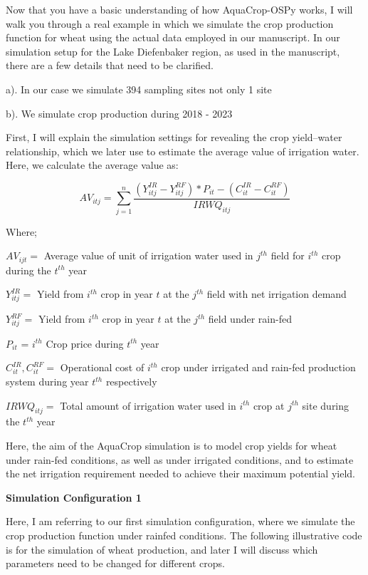 \documentclass[
  letterpaper,
  DIV=11,
  numbers=noendperiod]{scrartcl}
\begin{document}
Now that you have a basic understanding of how AquaCrop-OSPy works, I
will walk you through a real example in which we simulate the crop
production function for wheat using the actual data employed in our
manuscript. In our simulation setup for the Lake Diefenbaker region, as
used in the manuscript, there are a few details that need to be
clarified.

a). In our case we simulate 394 sampling sites not only 1 site

b). We simulate crop production during 2018 - 2023

First, I will explain the simulation settings for revealing the crop
yield--water relationship, which we later use to estimate the average
value of irrigation water. Here, we calculate the average value as:

\begin{equation}

{AV_{itj}} =     \sum_{j=1}^{n} \frac{(Y^{IR}_{itj} -Y^{RF}_{itj})*P_{it}-(C^{IR}_{it}-C^{RF}_{it})}{IRWQ_{itj}}
\label{equation1}
\end{equation}

Where;

\(AV_{ijt}=\) Average value of unit of irrigation water used in
\(j^{th}\) field for \(i^{th}\) crop during the \(t^{th}\) year

\(Y^{IR}_{itj}=\) Yield from \(i^{th}\) crop in year \(t\) at the
\(j^{th}\) field with net irrigation demand

\(Y^{RF}_{itj}=\) Yield from \(i^{th}\) crop in year \(t\) at the
\(j^{th}\) field under rain-fed

\(P_{it}\) = \(i^{th}\) Crop price during \(t^{th}\) year

\(C^{IR}_{it},C^{RF}_{it}=\) Operational cost of \(i^{th}\) crop under
irrigated and rain-fed production system during year \(t^{th}\)
respectively

\(IRWQ_{itj}=\) Total amount of irrigation water used in \(i^{th}\) crop
at \(j^{th}\) site during the \(t^{th}\) year

Here, the aim of the AquaCrop simulation is to model crop yields for
wheat under rain-fed conditions, as well as under irrigated conditions,
and to estimate the net irrigation requirement needed to achieve their
maximum potential yield.

\textbf{Simulation Configuration 1}

Here, I am referring to our first simulation configuration, where we
simulate the crop production function under rainfed conditions. The
following illustrative code is for the simulation of wheat production,
and later I will discuss which parameters need to be changed for
different crops.
\end{document}
